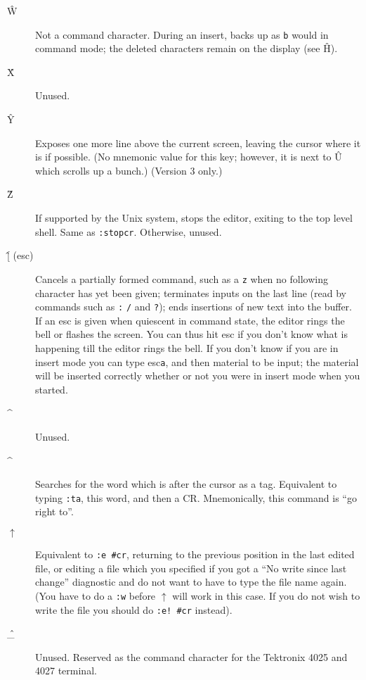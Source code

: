 \begin{description}
\item[\^{W}] Not a command character. During an insert, backs up as {\tt b}
would in command mode; the deleted characters remain on the display (see
\^{H}).

\item[\^{X}] Unused.

\item[\^{Y}] Exposes one more line above the current screen, leaving the
cursor where it is if possible. (No mnemonic value for this key; however, it
is next to \^{U} which scrolls up a bunch.) (Version 3 only.)

\item[\^{Z}] If supported by the Unix system, stops the editor, exiting to the
top level shell. Same as {\tt :stop\sc cr}. Otherwise, unused.

\item[\^{[} {\sc (esc)}] Cancels a partially formed command, such
as a {\tt z} when no following character has yet been given; terminates inputs
on the last line (read by commands such as {\tt :} {\tt /} and {\tt ?}); ends
insertions of new text into the buffer. If an {\sc esc} is given when
quiescent in command state, the editor rings the bell or flashes the screen.
You can thus hit {\sc esc} if you don't know what is happening till the editor
rings the bell. If you don't know if you are in insert mode you can type {\sc
esc\tt a}, and then material to be input; the material will be inserted
correctly whether or not you were in insert mode when you started.

\item[\^{}] Unused.

\item[\^{}] Searches for the word which is after the cursor as a
tag. Equivalent to typing {\tt :ta}, this word, and then a CR. Mnemonically,
this command is ``go right to''.

\item[\^{$\uparrow$}] Equivalent to {\tt :e \#\sc cr}, returning to the
previous position in the last edited file, or editing a file which you
specified if you got a ``No write since last change'' diagnostic and do not want
to have to type the file name again. (You have to do a {\tt :w} before
\^{$\uparrow$} will work in this case. If you do not wish to write the file
you should do {\tt :e!~\#\sc cr} instead).

\item[\^{\_}] Unused. Reserved as the command character for the Tektronix 4025
and 4027 terminal.


\end{description}
